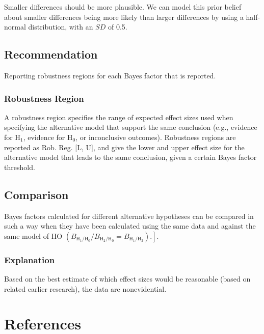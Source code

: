 \documentclass[11pt]{article}
\begin{document}
Smaller differences should be more plausible. We can model this prior belief about smaller differences being more likely than larger differences by using a half-normal distribution, with an $S D$ of 0.5.

\subsection{Recommendation}

Reporting robustness regions for each Bayes factor that is reported. \cite{10.1093/geronb/gby065}

\subsubsection{Robustness Region}
A robustness region specifies the range of expected effect sizes used when specifying the alternative model that support the same conclusion (e.g., evidence for $\mathrm{H}_1$, evidence for $\mathrm{H}_0$, or inconclusive outcomes). Robustness regions are reported as Rob. Reg. [L, U], and give the lower and upper effect size for the alternative model that leads to the same conclusion, given a certain Bayes factor threshold. 

\subsection{Comparison}

Bayes factors calculated for different alternative hypotheses can be compared in such a way when they have been calculated using the same data and against the same model of $\mathrm{HO}$ $\left.\left(B_{\mathrm{H}_1 / \mathrm{H}_0} / B_{\mathrm{H}_2 / \mathrm{H}_0}=B_{\mathrm{H}_1 / \mathrm{H}_2}\right).\right]$. 

\subsubsection{Explanation}

Based on the best estimate of which effect sizes would be reasonable (based on related earlier research), the data are nonevidential.





\section{References}


\end{document}
